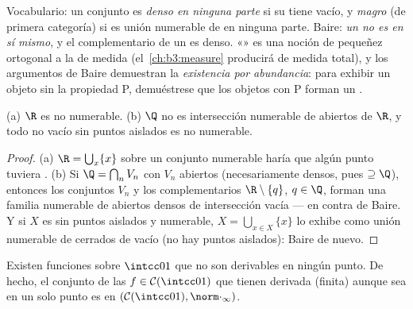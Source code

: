 \begin{remark}\label{rem:b3:complete:meagre}
Vocabulario: un conjunto es \emph{denso en ninguna parte} si su
 tiene
 vacío, y
\emph{magro} (de primera categoría) si es unión
numerable de  en
ninguna parte. Baire: \emph{un  no es  en sí
mismo}, y el complementario de un
 es denso.
«» es una noción de pequeñez
ortogonal a la de medida (el~\cref{ch:b3:measure} producirá
 de medida total), y
los argumentos de Baire demuestran la \emph{existencia por abundancia}:
para exhibir un objeto sin la propiedad P, demuéstrese que los objetos
con P forman un .
\end{remark}

\begin{corollary}\label{cor:b3:complete:bairecors}
(a) $\R$ es no numerable. (b) $\Q$ no es intersección numerable de
abiertos de $\R$, y todo  no vacío sin puntos aislados es no numerable.
\end{corollary}

\begin{proof}
(a) $\R = \bigcup_{x}\{x\}$ sobre un conjunto numerable haría que algún
punto tuviera . (b) Si
$\Q = \bigcap_n V_n$ con $V_n$ abiertos (necesariamente densos, pues
$\supseteq \Q$), entonces los conjuntos $V_n$ y los complementarios
$\R\setminus\{q\}$, $q \in \Q$, forman una familia numerable de abiertos
densos de intersección vacía --- en contra de Baire. Y si $X$ es
 sin puntos aislados y
numerable, $X = \bigcup_{x \in X}\{x\}$ lo exhibe como unión numerable
de cerrados de  vacío (no hay
puntos aislados): Baire de nuevo.
\end{proof}

\begin{theorem}
\label{thm:b3:complete:nowherediff}
Existen funciones  sobre
$\intcc01$ que no son derivables en ningún punto. De hecho, el conjunto
de las $f \in \mathcal C(\intcc01)$ que tienen derivada (finita) aunque
sea en un solo punto es  en
$(\mathcal C(\intcc01), \norm\cdot_\infty)$.
\end{theorem}

